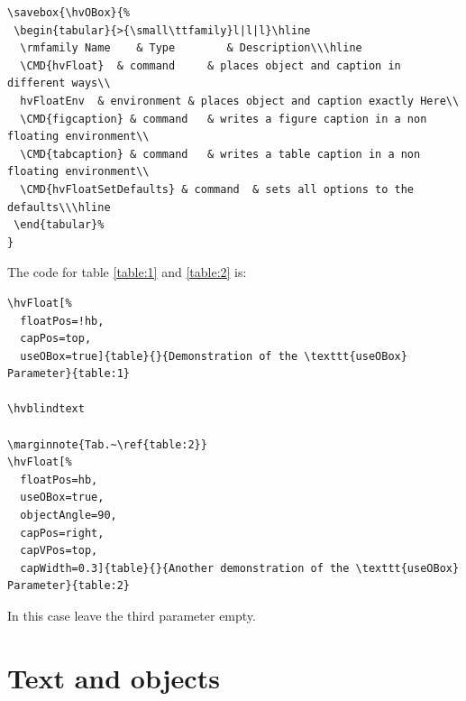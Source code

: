 \documentclass[twoside,paper=a4,usegeometry]{scrartcl}
\makeatletter
\def\hvblindtext{\textcolor{black!40}{\blindtext@text}}
\def\Lcs#1{\texttt{\textbackslash#1}\index{#1@\texttt{\textbackslash#1}}}
\let\CMD\Lcs
\makeatother
\begin{document}
\hvblindtext

\begin{lstlisting}
\savebox{\hvOBox}{%
 \begin{tabular}{>{\small\ttfamily}l|l|l}\hline
  \rmfamily Name    & Type        & Description\\\hline
  \CMD{hvFloat}  & command     & places object and caption in different ways\\
  hvFloatEnv  & environment & places object and caption exactly Here\\
  \CMD{figcaption} & command   & writes a figure caption in a non floating environment\\
  \CMD{tabcaption} & command   & writes a table caption in a non floating environment\\
  \CMD{hvFloatSetDefaults} & command  & sets all options to the defaults\\\hline
 \end{tabular}%
}
\end{lstlisting}

The code for table \ref{table:1} and \ref{table:2} is: 

\begin{lstlisting}
\hvFloat[%
  floatPos=!hb,
  capPos=top,
  useOBox=true]{table}{}{Demonstration of the \texttt{useOBox} Parameter}{table:1}

\hvblindtext

\marginnote{Tab.~\ref{table:2}}
\hvFloat[%
  floatPos=hb,
  useOBox=true,
  objectAngle=90,
  capPos=right,
  capVPos=top,
  capWidth=0.3]{table}{}{Another demonstration of the \texttt{useOBox} Parameter}{table:2}
\end{lstlisting}

In this case leave the third parameter empty.






\section{Text and objects}\label{sec:text}
\end{document}
